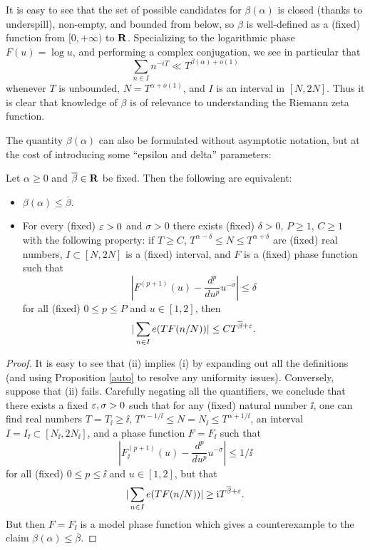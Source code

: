 
It is easy to see that the set of possible candidates for $\beta(\alpha)$ is closed (thanks to underspill), non-empty, and bounded from below, so $\beta$ is well-defined as a (fixed) function from $[0,+\infty)$ to $\mathbf{R}$.  Specializing to the logarithmic phase $F(u) = \log u$, and performing a complex conjugation, we see in particular that
\begin{equation}\label{beta-alpha}
    \sum_{n \in I} n^{-iT} \ll T^{\beta(\alpha)+o(1)}
\end{equation}
whenever $T$ is unbounded, $N = T^{\alpha+o(1)}$, and $I$ is an interval in $[N,2N]$.  Thus it is clear that knowledge of $\beta$ is of relevance to understanding the Riemann zeta function.


The quantity $\beta(\alpha)$ can also be formulated without asymptotic notation, but at the cost of introducing some ``epsilon and delta'' parameters:

\begin{lemma}\label{beta-asymp}
\leanok
Let $\alpha \geq 0$ and $\overline{\beta} \in \mathbf{R}$ be fixed.  Then the following are equivalent:
\begin{itemize}
\item[(i)] $\beta(\alpha) \leq \overline{\beta}$.
\item[(ii)] For every (fixed) $\varepsilon>0$ and $\sigma > 0$ there exists (fixed) $\delta>0$, $P \geq 1$, $C \geq 1$ with the following property: if $T \geq C$, $T^{\alpha-\delta} \leq N \leq T^{\alpha+\delta}$ are (fixed) real numbers, $I \subset [N,2N]$ is a (fixed) interval, and $F$ is a (fixed) phase function such that
\begin{equation}\label{fpu-bound}
     \left|F^{(p+1)}(u) - \frac{d^p}{du^p} u^{-\sigma}\right| \leq \delta
\end{equation}
for all (fixed) $0 \leq p \leq P$ and $u \in [1,2]$, then
$$ |\sum_{n \in I} e(T F(n/N))| \leq C T^{\overline{\beta}+\varepsilon}.$$
\end{itemize}
\end{lemma}

\begin{proof}\leanok  It is easy to see that (ii) implies (i) by expanding out all the definitions (and using Proposition \ref{auto} to resolve any uniformity issues).  Conversely, suppose that (ii) fails.  Carefully negating all the quantifiers, we conclude that there exists a fixed $\varepsilon, \sigma > 0$ such that for any (fixed) natural number $\ii$, one can find real numbers $T = T_{\ii} \geq \ii$, $T^{\alpha-1/\ii} \leq N = N_{\ii} \leq T^{\alpha+1/\ii}$, an interval $I = I_{\ii} \subset [N_\ii, 2N_\ii]$, and a phase function $F = F_{\ii}$ such that
$$ |F_\ii^{(p+1)}(u) - \frac{d^p}{du^p} u^{-\sigma}| \leq 1/\ii$$
for all (fixed) $0 \leq p \leq \ii$ and $u \in [1,2]$, but that
$$ |\sum_{n \in I} e(T F(n/N))| \geq {\mathrm{i}} T^{\overline{\beta}+\varepsilon}.$$
But then $F = F_\ii$ is a model phase function which gives a counterexample to the claim $\beta(\alpha) \leq \overline{\beta}$.
\end{proof}

